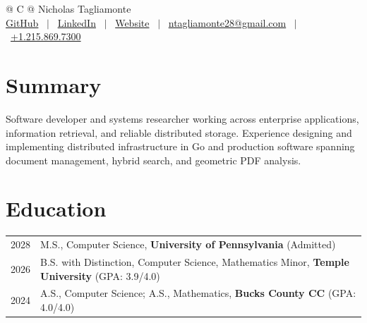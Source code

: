 \documentclass[a4paper,12pt]{article}
\begin{document}
\pagestyle{empty}


\begin{tabularx}{\linewidth}{@{} C @{}}
\Huge{Nicholas Tagliamonte} \\[7.5pt]
\href{https://github.com/nicktagliamonte}{GitHub} \ $|$ \
\href{https://www.linkedin.com/in/nick-tagliamonte-b44129241/}{LinkedIn} \ $|$ \
\href{https://nicktagliamonte.github.io}{Website} \ $|$ \
\href{mailto:ntagliamonte28@gmail.com}{ntagliamonte28@gmail.com} \ $|$ \
\href{tel:+12158697300}{+1.215.869.7300} \\
\end{tabularx}


\section{Summary}
Software developer and systems researcher working across enterprise applications, information retrieval, and reliable distributed storage. Experience designing and implementing distributed infrastructure in Go and production software spanning document management, hybrid search, and geometric PDF analysis.

\section{Education}
\begin{tabularx}{\linewidth}{@{}l X@{}}
2028 & M.S., Computer Science, \textbf{University of Pennsylvania} \hfill \normalsize (Admitted) \\

2026 & B.S. with Distinction, Computer Science, Mathematics Minor, \textbf{Temple University} \hfill \normalsize (GPA: 3.9/4.0) \\

2024 & A.S., Computer Science; A.S., Mathematics, \textbf{Bucks County CC } \hfill (GPA: 4.0/4.0) \\
\end{tabularx}
\\
\end{document}
